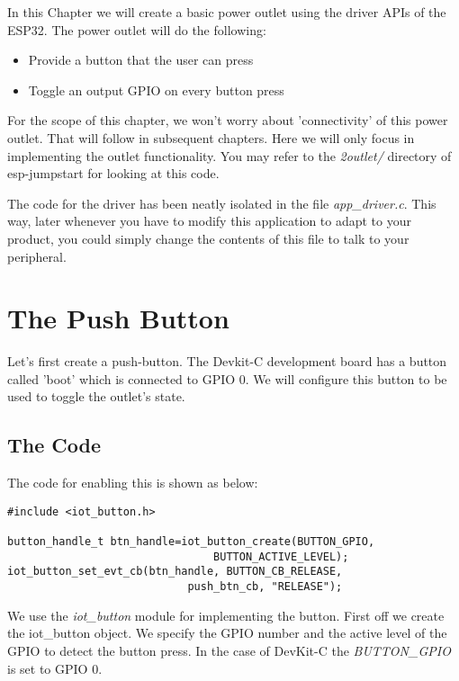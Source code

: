 \documentclass[main.tex]{subfiles}
\begin{document}
In this Chapter we will create a basic power outlet using the driver APIs of the ESP32. The power outlet will do the following:
\begin{itemize}
    \item Provide a button that the user can press
    \item Toggle an output GPIO on every button press
\end{itemize}
For the scope of this chapter, we won't worry about 'connectivity' of this power outlet. That will follow in subsequent chapters. Here we will only focus in implementing the outlet functionality. You may refer to the \textit{2outlet/} directory of esp-jumpstart for looking at this code. 

The code for the driver has been neatly isolated in the file \textit{app\_driver.c}. This way, later whenever you have to modify this application to adapt to your product, you could simply change the contents of this file to talk to your peripheral.

\section{The Push Button}
Let's first create a push-button. The Devkit-C development board has a button called 'boot' which is connected to GPIO 0. We will configure this button to be used to toggle the outlet's state.


\subsection{The Code}\label{sec:push_button}
The code for enabling this is shown as below:
\begin{verbatim}
#include <iot_button.h>

button_handle_t btn_handle=iot_button_create(BUTTON_GPIO,
                                BUTTON_ACTIVE_LEVEL);
iot_button_set_evt_cb(btn_handle, BUTTON_CB_RELEASE,
                            push_btn_cb, "RELEASE");

\end{verbatim}

We use the \textit{iot\_button} module for implementing the button. 
First off we create the iot\_button object. We specify the GPIO number and the active level of the GPIO to detect the button press. In the case of DevKit-C the \textit{BUTTON\_GPIO} is set to GPIO 0. 
\end{document}
